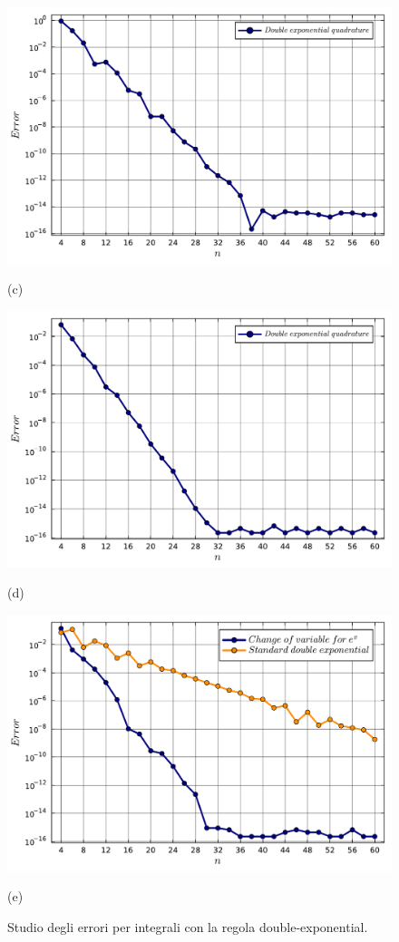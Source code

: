 \documentclass[letterpaper, 12pt]{article}
\numberwithin{equation}{section}    %
\begin{document}
\begin{figure}[!ht]
\begin{minipage}[b]{0.47\textwidth}
        \includegraphics[width=\textwidth]{5423.pdf}
        \caption*{(c)}
    \end{minipage}
    \begin{minipage}[b]{0.47\textwidth}
        \includegraphics[width=\textwidth]{5424.pdf}
        \caption*{(d)}
    \end{minipage}
    \begin{minipage}[b]{0.47\textwidth}
        \includegraphics[width=\textwidth]{5425.pdf}
        \caption*{(e)}
    \end{minipage}
    \caption{Studio degli errori per integrali con la regola double-exponential.}
    \label{fig:es5_4_2_1}
\end{figure}
\end{document}
